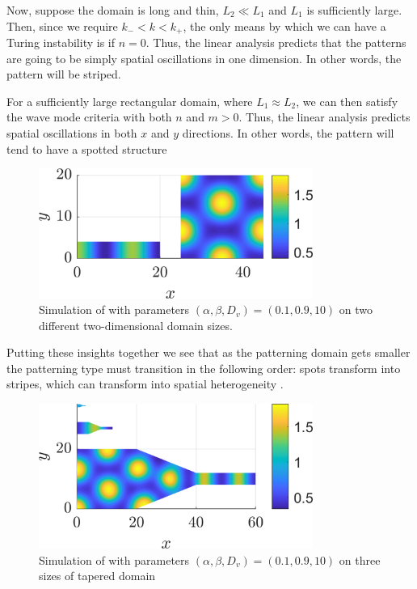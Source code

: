 Now, suppose the domain is long and thin, \ie $L_2 \ll L_1$ and $L_1$ is sufficiently large. Then, since we require $k_-<k<k_+$, the only means by which we can have a Turing instability is if $n=0$. Thus, the linear analysis predicts that the patterns are going to be simply spatial oscillations in one dimension. In other words, the pattern will be striped.

For a sufficiently large rectangular domain, where  $L_1 \approx L_2$, we can then satisfy the wave mode criteria with both $n$ and $m>0$. Thus, the linear analysis predicts spatial oscillations in both $x$ and $y$ directions. In other words, the pattern will tend to have a spotted structure 
\begin{figure}[!!!h!!!tbp]
\centering
\includegraphics[width=0.8\textwidth]{../Pictures/Big_and_small_domain.png}
\caption{Simulation of  with parameters $(\alpha,\beta,D_v)=(0.1,0.9,10)$ on two different two-dimensional domain sizes. \label{Big_and_small_domain}}
\end{figure}

Putting these insights together we see that as the patterning domain gets smaller the patterning type must transition in the following order: spots transform into stripes, which can transform into spatial heterogeneity .
 \begin{figure}[!!!h!!!tbp]
\centering
\includegraphics[width=0.8\textwidth]{../Pictures/Tapered_domain.png}
\caption{Simulation of  with parameters $(\alpha,\beta,D_v)=(0.1,0.9,10)$ on three sizes of tapered domain \label{Tapered_domain}}
\end{figure}

